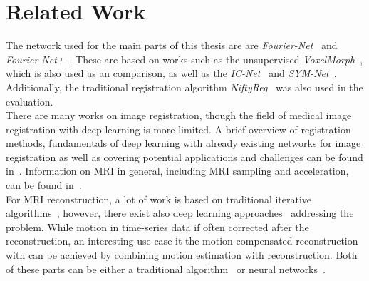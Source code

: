 \section{Related Work} \label{Sec:RelatedWork}
The network used for the main parts of this thesis are are \emph{Fourier-Net}~\cite{Fourier-Net} and \emph{Fourier-Net+}~\cite{Fourier-Net+}. These are based on works such as the unsupervised \emph{VoxelMorph}~\cite{Voxelmorph}, which is also used as an comparison, as well as the \emph{IC-Net}~\cite{IC-Net} and \emph{SYM-Net}~\cite{SYM-Net}. Additionally, the traditional registration algorithm \emph{NiftyReg}~\cite{NiftiReg} was also used in the evaluation.\\
There are many works on image registration, though the field of medical image registration with deep learning is more limited. A brief overview of registration methods, fundamentals of deep learning with already existing networks for image registration as well as covering potential applications and challenges can be found in~\cite{Chen2020,Haskins2020,Fu2020,Zou2022,Chen2023}. Information on MRI in general, including MRI sampling and acceleration, can be found in~\cite{Serai2021,SamplingStrategies,PulseSequences,AdvancesPI,CS-MRI}.\\
For MRI reconstruction, a lot of work is based on traditional iterative algorithms~\cite{AdvancesPI,CS-MRI,ParallelMRI,GRAPPA}, however, there exist also deep learning approaches~\cite{DeepMRIReconstructionRadialSubsampling,DeepMRIReconstructionSubsampling}
addressing the problem. While motion in time-series data if often corrected after the reconstruction, an interesting use-case it the motion-compensated reconstruction with can be achieved by combining motion estimation with reconstruction. Both of these parts can be either a traditional algorithm~\cite{GRICS} or neural networks~\cite{Pan2024,Zou2024}.


